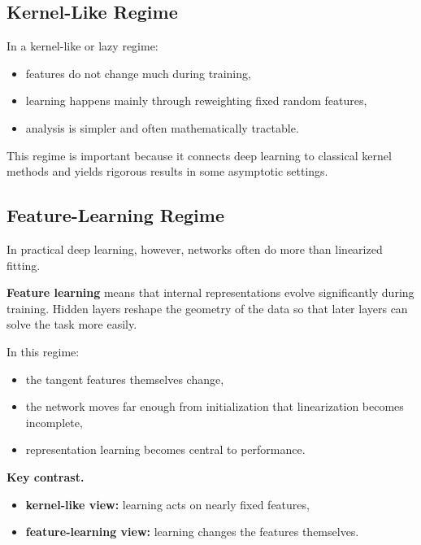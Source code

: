 \subsection{Kernel-Like Regime}

In a kernel-like or lazy regime:
\begin{itemize}
    \item features do not change much during training,
    \item learning happens mainly through reweighting fixed random features,
    \item analysis is simpler and often mathematically tractable.
\end{itemize}

\medskip

\noindent
This regime is important because it connects deep learning to classical kernel methods and yields rigorous results in some asymptotic settings.

\subsection{Feature-Learning Regime}

In practical deep learning, however, networks often do more than linearized fitting.

\medskip

\noindent
\textbf{Feature learning} means that internal representations evolve significantly during training. Hidden layers reshape the geometry of the data so that later layers can solve the task more easily.

\medskip

\noindent
In this regime:
\begin{itemize}
    \item the tangent features themselves change,
    \item the network moves far enough from initialization that linearization becomes incomplete,
    \item representation learning becomes central to performance.
\end{itemize}

\medskip

\noindent
\textbf{Key contrast.}
\begin{itemize}
    \item \textbf{kernel-like view:} learning acts on nearly fixed features,
    \item \textbf{feature-learning view:} learning changes the features themselves.
\end{itemize}


